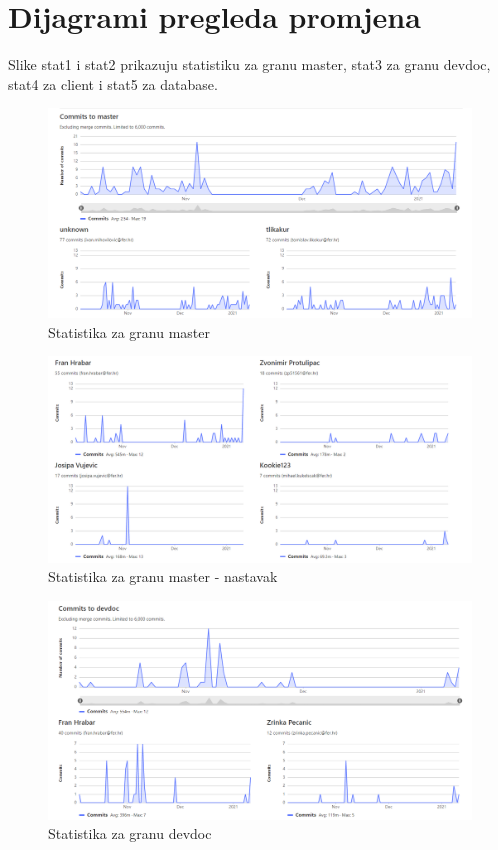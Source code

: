 		\section*{Dijagrami pregleda promjena}
		 Slike stat1 i stat2 prikazuju statistiku za granu master, stat3 za granu devdoc, stat4 za client i stat5 za database.
		 \\
		 \begin{figure}[H]
		 	\includegraphics[scale=0.45]{slike/stat1.PNG} 
		 	\centering
		 	\caption{Statistika za granu master}
		 	\label{fig:stat1}%
		 \end{figure}
	 	
	 	\begin{figure}[H]
	 		\includegraphics[scale=0.45]{slike/stat2.PNG} 
	 		\centering
	 		\caption{Statistika za granu master - nastavak}
	 		\label{fig:stat2}%
	 	\end{figure}
 	
 		\begin{figure}[H]
 			\includegraphics[scale=0.45]{slike/stat3.PNG} 
 			\centering
 			\caption{Statistika za granu devdoc}
 			\label{fig:stat3}%
 		\end{figure}
 	
